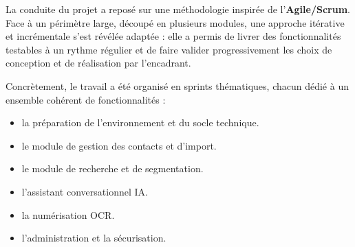 La conduite du projet a reposé sur une méthodologie inspirée de l'\textbf{Agile/Scrum}. Face à un périmètre large, découpé en plusieurs modules, une approche itérative et incrémentale s'est révélée adaptée : elle a permis de livrer des fonctionnalités testables à un rythme régulier et de faire valider progressivement les choix de conception et de réalisation par l'encadrant.

Concrètement, le travail a été organisé en sprints thématiques, chacun dédié à un ensemble cohérent de fonctionnalités :

\begin{itemize}[leftmargin=*,itemsep=3pt]
  \item la préparation de l'environnement et du socle technique.
  \item le module de gestion des contacts et d'import.
  \item le module de recherche et de segmentation.
  \item l'assistant conversationnel IA.
  \item la numérisation OCR.
  \item l'administration et la sécurisation.
\end{itemize}
